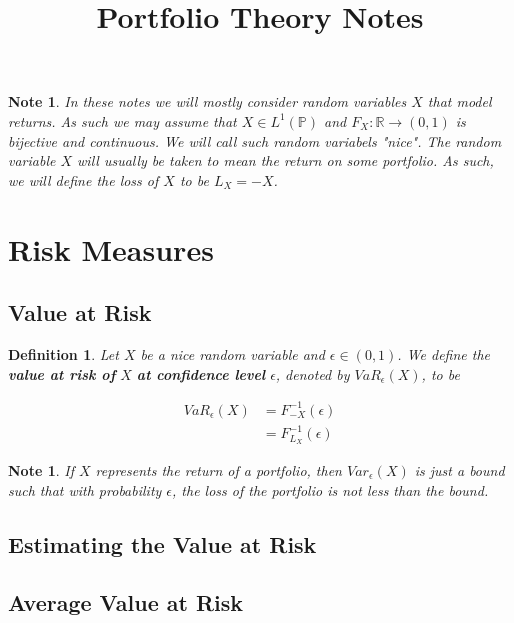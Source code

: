\documentclass[12pt]{amsart}
\newtheorem{defn}[thm]{Definition}
\newtheorem{note}[thm]{Note}
\newcommand{\ep}{\epsilon}
\newcommand{\R}{\mathbb{R}}
\renewcommand{\P}{\mathbb{P}}
\begin{document}
\title{Portfolio Theory Notes}
\maketitle

\tableofcontents

\begin{note}
In these notes we will mostly consider random variables $X$ that model returns. As such we may assume that $X \in L^1(\P)$ and $F_X:\R \rightarrow (0,1)$ is bijective and continuous. We will call such random variabels "nice". The random variable $X$ will usually be taken to mean the return on some portfolio. As such, we will define the loss of $X$ to be $L_X = -X$.
\end{note}

\section{Risk Measures}

\subsection{Value at Risk}

\begin{defn}
Let $X$ be a nice random variable and $\ep \in (0,1)$. We define the \textbf{value at risk of } $X$ \textbf{at confidence level } $\ep$, denoted by $VaR_{\ep}(X)$, to be 

\begin{align*}
VaR_{\ep}(X) 
&= F^{-1}_{-X}(\ep)\\
&= F^{-1}_{L_X}(\ep)
\end{align*}
\end{defn}

\begin{note}
If $X$ represents the return of a portfolio, then $Var_{\ep}(X)$ is just a bound such that with probability $\ep$, the loss of the portfolio is not less than the bound.  
\end{note}

\subsection{Estimating the Value at Risk}

\subsection{Average Value at Risk}
\end{document}

